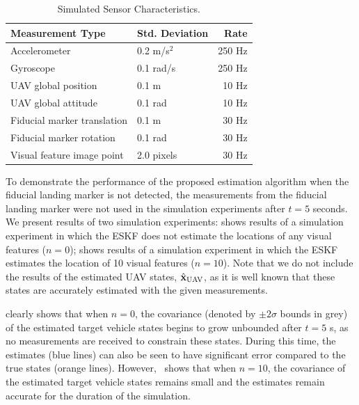 \begin{table}[h!]
  \begin{center}
    \caption{Simulated Sensor Characteristics.}
    \label{tab:sim_meas_noise}
    \begin{tabular}{l|l|r}
      \textbf{Measurement Type} & \textbf{Std. Deviation} & \textbf{Rate} \\
      \hline
      Accelerometer & 0.2 m/s$^2$ & 250 Hz \\
      Gyroscope & 0.1 rad/s & 250 Hz \\
      UAV global position & 0.1 m & 10 Hz \\
      UAV global attitude & 0.1 rad & 10 Hz \\
      Fiducial marker translation & 0.1 m & 30 Hz \\
      Fiducial marker rotation & 0.1 rad & 30 Hz \\
      Visual feature image point & 2.0 pixels & 30 Hz \\
    \end{tabular}
  \end{center}
\end{table}

To demonstrate the performance of the proposed estimation algorithm when the
fiducial landing marker is not detected, the measurements from the fiducial
landing marker were not used in the simulation experiments after $t = 5$
seconds.
We present results of two simulation experiments:
 shows results of a simulation experiment in which the ESKF
does not estimate the locations of any visual features ($n = 0$);
 shows results of a simulation experiment in which
the ESKF estimates the location of 10 visual features ($n = 10$).
Note that we
do not include the results of the estimated UAV states, $\hat{\boldsymbol{\mathrm{x}}}_{\text{UAV}}$,
as it is well known that these states are accurately estimated with the given
measurements.

 clearly shows that when $n = 0$, the covariance (denoted by
$\pm 2 \sigma$ bounds in grey) 
of the estimated target
vehicle states  begins to grow unbounded after $t = 5$ s, as no measurements are
received to constrain these states. During this time, the estimates (blue lines)
can also be seen to have significant error compared to the true states (orange
lines). However,~ shows that when $n = 10$, the covariance
of the estimated target vehicle states remains small and the estimates remain
accurate for the duration of the simulation.


